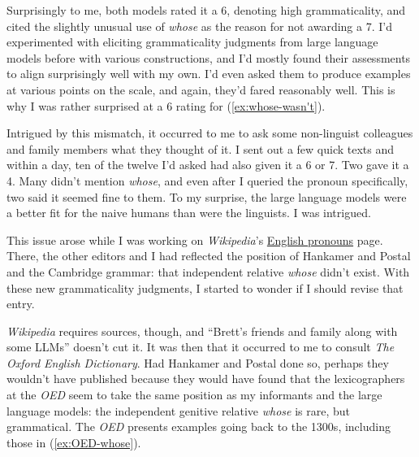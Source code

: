  \label{ex:whose-wasn't}
\z

Surprisingly to me, both models rated it a 6, denoting high grammaticality, and cited the slightly unusual use of \textit{whose} as the reason for not awarding a 7. I'd experimented with eliciting grammaticality judgments from large language models before with various constructions, and I'd mostly found their assessments to align surprisingly well with my own. I'd even asked them to produce examples at various points on the scale, and again, they'd fared reasonably well. This is why I was rather surprised at a 6 rating for (\ref{ex:whose-wasn't}).

Intrigued by this mismatch, it occurred to me to ask some non-linguist colleagues and family members what they thought of it. I sent out a few quick texts and within a day, ten of the twelve I'd asked had also given it a 6 or 7. Two gave it a 4. Many didn't mention \textit{whose}, and even after I queried the pronoun specifically, two said it seemed fine to them. To my surprise, the large language models were a better fit for the naive humans than were the linguists. I was intrigued.

This issue arose while I was working on \textit{Wikipedia}'s \href{https://en.wikipedia.org/wiki/English_pronouns}{English pronouns} page. There, the other editors and I had reflected the position of Hankamer and Postal and the Cambridge grammar: that independent relative \textit{whose} didn't exist. With these new grammaticality judgments, I started to wonder if I should revise that entry.

\textit{Wikipedia} requires sources, though, and \enquote{Brett's friends and family along with some LLMs} doesn't cut it. It was then that it occurred to me to consult \textit{The Oxford English Dictionary}. Had Hankamer and Postal done so, perhaps they wouldn't have published because they would have found that the lexicographers at the \textit{OED} seem to take the same position as my informants and the large language models: the independent genitive relative \textit{whose} is rare, but grammatical. The \textit{OED} presents examples going back to the 1300s, including those in (\ref{ex:OED-whose}). %

